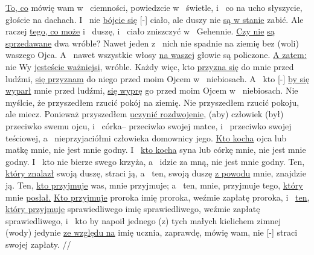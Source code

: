  \underline{To, co} mówię wam w~ ciemności, powiedzcie w~ świetle, i~ co na ucho słyszycie, głoście na dachach.
 I~ nie \underline{bójcie się} [-]  ciało, ale duszy nie \underline{są w stanie} zabić. Ale  raczej \underline{tego, co może} i~ duszę, i~ ciało zniszczyć w~ Gehennie.
 \underline{Czy nie}  \underline{są sprzedawane} dwa wróble? Nawet jeden z~ nich nie spadnie na ziemię bez (woli) waszego Ojca.
 A~ nawet wszystkie włosy \underline{na waszej} głowie są policzone.
 \underline{A zatem:} nie  Wy \underline{jesteście ważniejsi,}  wróble.
 Każdy więc, kto \underline{przyzna się} do mnie przed ludźmi,  \underline{się przyznam} do niego przed moim Ojcem w~ niebiosach.
 A~ kto [-] \underline{by się wyparł} mnie przed ludźmi,  \underline{się wyprę} go przed moim Ojcem w~ niebiosach.
 Nie myślcie, że przyszedłem rzucić pokój na ziemię. Nie przyszedłem rzucić pokoju, ale miecz.
 Ponieważ przyszedłem \underline{uczynić rozdwojenie,} (aby) człowiek (był) przeciwko swemu ojcu, i~ córka– przeciwko swojej matce, i~  przeciwko swojej teściowej,
 a~ nieprzyjaciółmi człowieka domownicy jego.
 \underline{Kto kocha} ojca lub matkę  mnie, nie jest mnie godny. I~ \underline{kto kocha} syna lub córkę  mnie, nie jest mnie godny.
 I~ kto nie bierze swego krzyża, a~ idzie za mną, nie jest mnie godny.
 Ten, \underline{który znalazł} swoją duszę, straci ją, a~ ten,  swoją duszę \underline{z powodu} mnie, znajdzie ją.
 Ten, \underline{kto przyjmuje} was, mnie przyjmuje; a~ ten,  mnie, przyjmuje tego, \underline{który} mnie \underline{posłał.}
 \underline{Kto przyjmuje} proroka  imię proroka, weźmie zapłatę proroka, i~ \underline{ten, który przyjmuje} sprawiedliwego  imię sprawiedliwego, weźmie zapłatę sprawiedliwego,
 i~ kto by napoił jednego (z) tych małych kielichem zimnej (wody) jedynie \underline{ze względu na} imię ucznia, zaprawdę, mówię wam, nie [-] straci swojej zapłaty.
//
\endgl
